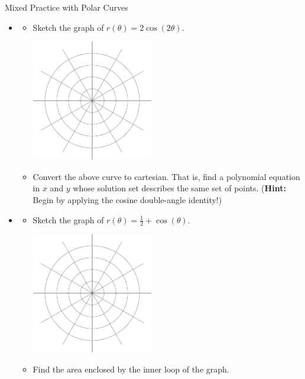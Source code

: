 \begin{exercise}{Mixed Practice with Polar Curves \Coffeecup \Coffeecup \Coffeecup}

\begin{itemize}

\item \begin{itemize}
\item Sketch the graph of $r(\theta)=2 \cos(2\theta)$.
	\begin{center}
		\includegraphics[width=150pt]{polar.eps}
	\end{center}

\item Convert the above curve to cartesian.  That is, find a polynomial equation in $x$ and $y$ whose solution set describes the same set of points.  ({\bf Hint:} Begin by applying the cosine double-angle identity!)

\vspace*{1in}

\end{itemize} 

\item \begin{itemize}
\item  Sketch the graph of  $r(\theta)=\frac{1}{2}+\cos(\theta)$.
	\begin{center}
		\includegraphics[width=150pt]{polar.eps}
	\end{center}
\item  Find the area enclosed by the inner loop of the graph.
\vspace*{2in}
\end{itemize}


\end{itemize}
\end{exercise}
